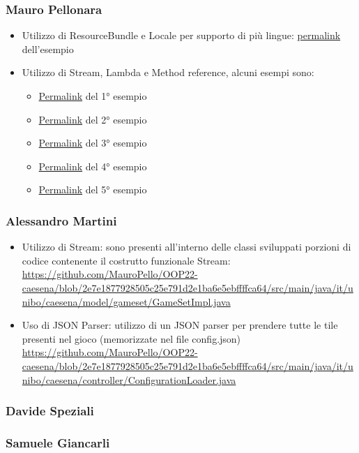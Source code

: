 \subsubsection*{Mauro Pellonara}
\begin{itemize}
    \item Utilizzo di ResourceBundle e Locale per supporto di più lingue: \href{https://github.com/MauroPello/OOP22-caesena/blob/main/src/main/java/it/unibo/caesena/view/LocaleHelper.java}{permalink} dell'esempio
    \item Utilizzo di Stream, Lambda e Method reference, alcuni esempi sono:
    \begin{itemize}
        \item \href{https://github.com/MauroPello/OOP22-caesena/blob/b817cad200379d563deda711ebf7773b572fb061/src/main/java/it/unibo/caesena/model/GameSetTileMediatorImpl.java#L107}{Permalink} del 1° esempio
        \item \href{https://github.com/MauroPello/OOP22-caesena/blob/dff66c49fc9fb8e6bdd8d328986f4b9ee3a4b2dc/src/main/java/it/unibo/caesena/controller/ControllerImpl.java#L134}{Permalink} del 2° esempio
        \item \href{https://github.com/MauroPello/OOP22-caesena/blob/dff66c49fc9fb8e6bdd8d328986f4b9ee3a4b2dc/src/main/java/it/unibo/caesena/controller/ControllerImpl.java#L390}{Permalink} del 3° esempio
        \item \href{https://github.com/MauroPello/OOP22-caesena/blob/b817cad200379d563deda711ebf7773b572fb061/src/main/java/it/unibo/caesena/model/GameSetTileMediatorImpl.java#L203}{Permalink} del 4° esempio
        \item \href{https://github.com/MauroPello/OOP22-caesena/blob/b817cad200379d563deda711ebf7773b572fb061/src/main/java/it/unibo/caesena/model/GameSetTileMediatorImpl.java#L213}{Permalink} del 5° esempio
    \end{itemize}
\end{itemize}

\subsubsection*{Alessandro Martini}
\begin{itemize}
    \item Utilizzo di Stream: sono presenti all'interno delle classi sviluppati porzioni di codice contenente il costrutto funzionale Stream: \url{https://github.com/MauroPello/OOP22-caesena/blob/2e7e1877928505c25e791d2e1ba6e5ebffffca64/src/main/java/it/unibo/caesena/model/gameset/GameSetImpl.java}
    \item Uso di JSON Parser: utilizzo di un JSON parser per prendere tutte le tile presenti nel gioco (memorizzate nel file config.json) \url{https://github.com/MauroPello/OOP22-caesena/blob/2e7e1877928505c25e791d2e1ba6e5ebffffca64/src/main/java/it/unibo/caesena/controller/ConfigurationLoader.java}
\end{itemize}

\subsubsection*{Davide Speziali}

\subsubsection*{Samuele Giancarli}
